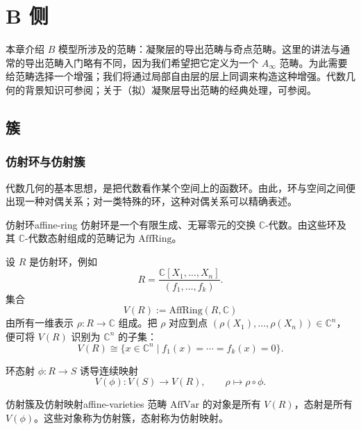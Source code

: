 \chapter{B 侧}\label{ch:algebraic-geometry}
本章介绍 $B$ 模型所涉及的范畴：凝聚层的导出范畴与奇点范畴。这里的讲法与通常的导出范畴入门略有不同，因为我们希望把它定义为一个 $A_\infty$ 范畴。为此需要给范畴选择一个增强；我们将通过局部自由层的层上同调来构造这种增强。代数几何的背景知识可参阅；关于（拟）凝聚层导出范畴的经典处理，可参阅。

\section{簇}\label{sec:varieties}
\subsection{仿射环与仿射簇}\label{subsec:affine-rings-varieties}
代数几何的基本思想，是把代数看作某个空间上的函数环。由此，环与空间之间便出现一种对偶关系；对一类特殊的环，这种对偶关系可以精确表述。

\begin{definition}{仿射环}{affine-ring}
仿射环是一个有限生成、无幂零元的交换 $\mathbb C$-代数。由这些环及其 $\mathbb C$-代数态射组成的范畴记为 $\mathrm{AffRing}$。
\end{definition}

设 $R$ 是仿射环，例如
\[
  R=\frac{\mathbb C[X_1,\ldots,X_n]}{(f_1,\ldots,f_k)}.
\]
集合
\[
  V(R):=\mathrm{AffRing}(R,\mathbb C)
\]
由所有一维表示 $\rho\colon R\to\mathbb C$ 组成。把 $\rho$ 对应到点 $(\rho(X_1),\ldots,\rho(X_n))\in\mathbb C^n$，便可将 $V(R)$ 识别为 $\mathbb C^n$ 的子集：
\[
  V(R)\cong\{x\in\mathbb C^n\mid f_1(x)=\cdots=f_k(x)=0\}.
\]

环态射 $\phi\colon R\to S$ 诱导连续映射
\[
  V(\phi)\colon V(S)\longrightarrow V(R),\qquad \rho\longmapsto\rho\circ\phi.
\]

\begin{definition}{仿射簇及仿射映射}{affine-varieties}
范畴 $\mathrm{AffVar}$ 的对象是所有 $V(R)$，态射是所有 $V(\phi)$。这些对象称为仿射簇，态射称为仿射映射。
\end{definition}

